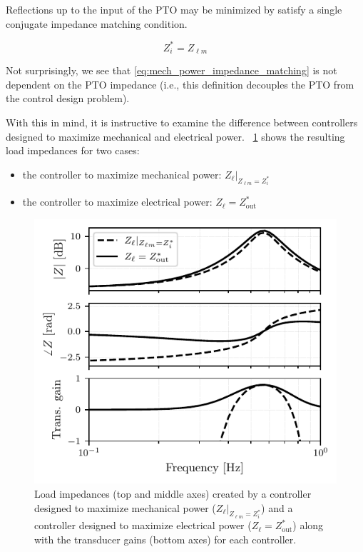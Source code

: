 \documentclass[lettersize,journal]{IEEEtran}
\begin{document}
Reflections up to the input of the PTO may be minimized by satisfy a single conjugate impedance matching condition.

\begin{equation}
        Z_i^* = Z_{\ell m}
        \label{eq:mech_power_impedance_matching}
\end{equation}

\noindent{}Not surprisingly, we see that \eqref{eq:mech_power_impedance_matching} is not dependent on the PTO impedance (i.e., this definition decouples the PTO from the control design problem).

With this in mind, it is instructive to examine the difference between controllers designed to maximize mechanical and electrical power.
\figurename~\ref{fig:wec_as_multiport_load_impedance_for_mech_power} shows the resulting load impedances for two cases:

\begin{itemize}
        \item the controller to maximize mechanical power: $Z_\ell \vert_{Z_{\ell m} = Z_i^*}$
        \item the controller to maximize electrical power: $Z_\ell = Z_{\mathrm{out}}^*$
\end{itemize}

\begin{figure}[tb]
        \centering
        \includegraphics[width=1\columnwidth]{wec_as_multiport_load_impedance_for_mech_power_Bode.pdf}
        \caption{Load impedances (top and middle axes) created by a controller designed to maximize mechanical power ($Z_\ell \vert_{Z_{\ell m} = Z_i^*}$) and a controller designed to maximize electrical power ($Z_\ell = Z_{\mathrm{out}}^*$) along with the transducer gains (bottom axes) for each controller.}
        \label{fig:wec_as_multiport_load_impedance_for_mech_power}
\end{figure}
\end{document}
